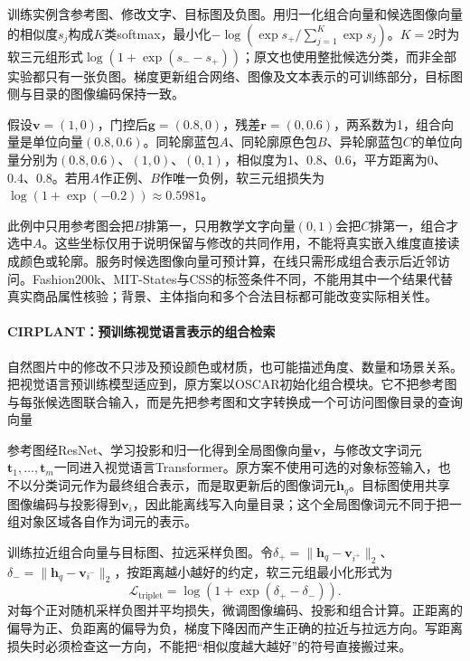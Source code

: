 训练实例含参考图、修改文字、目标图及负图。用归一化组合向量和候选图像向量的相似度$s_j$构成$K$类softmax，最小化$-\log(\exp s_+/\sum_{j=1}^K\exp s_j)$。$K=2$时为软三元组形式$\log(1+\exp(s_--s_+))$；原文也使用整批候选分类，而非全部实验都只有一张负图。梯度更新组合网络、图像及文本表示的可训练部分，目标图侧与目录的图像编码保持一致。

假设$\bm v=(1,0)$，门控后$\bm g=(0.8,0)$，残差$\bm r=(0,0.6)$，两系数为1，组合向量是单位向量$(0.8,0.6)$。同轮廓蓝包$A$、同轮廓原色包$B$、异轮廓蓝包$C$的单位向量分别为$(0.8,0.6)$、$(1,0)$、$(0,1)$，相似度为1、0.8、0.6，平方距离为0、0.4、0.8。若用$A$作正例、$B$作唯一负例，软三元组损失为$\log(1+\exp(-0.2))\approx0.5981$。

此例中只用参考图会把$B$排第一，只用教学文字向量$(0,1)$会把$C$排第一，组合才选中$A$。这些坐标仅用于说明保留与修改的共同作用，不能将真实嵌入维度直接读成颜色或轮廓。服务时候选图像向量可预计算，在线只需形成组合表示后近邻访问。Fashion200k、MIT-States与CSS的标签条件不同，不能用其中一个结果代替真实商品属性核验；背景、主体指向和多个合法目标都可能改变实际相关性。

\Needspace{100mm}
\paragraph{CIRPLANT：预训练视觉语言表示的组合检索}
\label{sec:rs-search-cirplant}

自然图片中的修改不只涉及预设颜色或材质，也可能描述角度、数量和场景关系。把视觉语言预训练模型适应到，原方案以OSCAR初始化组合模块。它不把参考图与每张候选图联合输入，而是先把参考图和文字转换成一个可访问图像目录的查询向量

参考图经ResNet、学习投影和归一化得到全局图像向量$\bm v$，与修改文字词元$\bm t_1,\ldots,\bm t_m$一同进入视觉语言Transformer。原方案不使用可选的对象标签输入，也不以分类词元作为最终组合表示，而是取更新后的图像词元$\bm h_q$。目标图使用共享图像编码与投影得到$\bm v_i$，因此能离线写入向量目录；这个全局图像词元不同于把一组对象区域各自作为词元的表示。

训练拉近组合向量与目标图、拉远采样负图。令$\delta_+=\|\bm h_q-\bm v_{i^+}\|_2$、$\delta_-=\|\bm h_q-\bm v_{i^-}\|_2$，按距离越小越好的约定，软三元组最小化形式为
\begin{equation}
 \mathcal L_{\mathrm{triplet}}=\log(1+\exp(\delta_+-\delta_-)).
 \label{eq:rs-search-cirplant-objective}
\end{equation}
对每个正对随机采样负图并平均损失，微调图像编码、投影和组合计算。正距离的偏导为正、负距离的偏导为负，梯度下降因而产生正确的拉近与拉远方向。写距离损失时必须检查这一方向，不能把“相似度越大越好”的符号直接搬过来。


